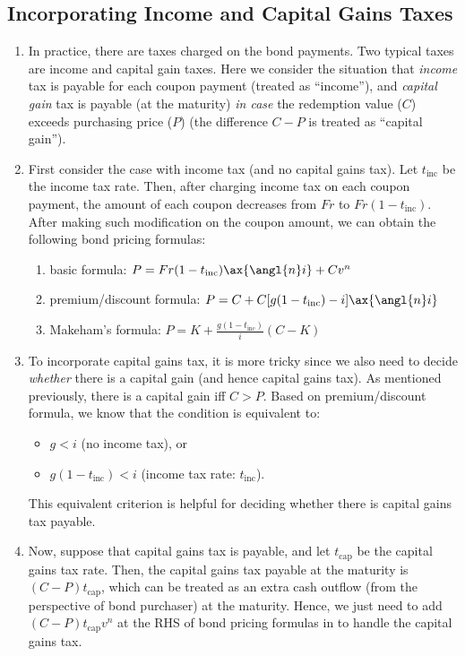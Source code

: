 \subsection{Incorporating Income and Capital Gains Taxes}
\begin{enumerate}
\item In practice, there are taxes charged on the bond payments. Two typical
taxes are income and capital gain taxes. Here we consider the situation that
\emph{income} tax is payable for each coupon payment (treated as ``income''),
and \emph{capital gain} tax is payable (at the maturity) \emph{in case} the redemption
value (\(C\)) exceeds purchasing price (\(P\)) (the difference \(C-P\) is
treated as ``capital gain'').

\item \label{it:inc-tax-basic-prem-desc-makeham-fmlas}
First consider the case with income tax (and no capital gains tax). Let
\(t_{\text{inc}}\) be the income tax rate. Then, after charging income tax on
each coupon payment, the amount of each coupon decreases from \(Fr\) to
\(Fr(1-t_{\text{inc}})\). After making such modification on the coupon amount,
we can obtain the following bond pricing formulas:
\begin{enumerate}
\item basic formula: \(P=Fr(1-t_{\text{inc}})\ax{\angl{n}i}+Cv^n\)
\item premium/discount formula: \(P=C+C\qty[g(1-t_{\text{inc}})-i]\ax{\angl{n}i}\)
\item Makeham's formula: \(\displaystyle P=K+\frac{g(1-t_{\text{inc}})}{i}(C-K)\)
\end{enumerate}

\item \label{it:cap-gain-criterion}
To incorporate capital gains tax, it is more tricky since we also need to
decide \emph{whether} there is a capital gain (and hence capital gains tax). As
mentioned previously, there is a capital gain iff \(C>P\). Based on
premium/discount formula, we know that the condition is equivalent to:
\begin{itemize}
\item \(g<i\) (no income tax), or
\item \(g(1-t_{\text{inc}})<i\) (income tax rate: \(t_{\text{inc}}\)).
\end{itemize}
\begin{note}
This equivalent criterion is helpful for deciding whether there is capital
gains tax payable.
\end{note}

\item \label{it:handle-cap-gain-tax}
Now, suppose that capital gains tax is payable, and let \(t_{\text{cap}}\) be
the capital gains tax rate. Then, the capital gains tax payable at the maturity
is \((C-P)t_{\text{cap}}\), which can be treated as an extra cash outflow (from
the perspective of bond purchaser) at the maturity. Hence, we just need to add
\((C-P)t_{\text{cap}}v^n\) at the RHS of bond pricing formulas in
 to handle the capital gains tax.
\end{enumerate}
